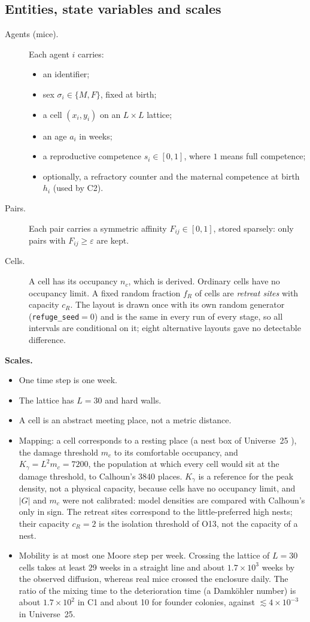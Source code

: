 \documentclass[preprint,12pt,authoryear]{elsarticle}
\begin{document}
\subsection*{Entities, state variables and scales}
\begin{description}
\item[Agents (mice).] Each agent $i$ carries:
  \begin{itemize}
  \item an identifier;
  \item sex $\sigma_i\in\{M,F\}$, fixed at birth;
  \item a cell $(x_i,y_i)$ on an $L\times L$ lattice;
  \item an age $a_i$ in weeks;
  \item a reproductive competence $s_i\in[0,1]$, where $1$ means full competence;
  \item optionally, a refractory counter and the maternal competence at birth $h_i$ (used by \textsf{C2}).
  \end{itemize}
\item[Pairs.] Each pair carries a symmetric affinity $F_{ij}\in[0,1]$, stored sparsely: only pairs with
  $F_{ij}\ge\varepsilon$ are kept.
\item[Cells.] A cell has its occupancy $n_c$, which is derived. Ordinary cells have no occupancy limit. A fixed
  random fraction $f_R$ of cells are \emph{retreat sites} with capacity $c_R$. The layout is drawn once with its own random
  generator (\texttt{refuge\_seed}${}=0$) and is the same in every run of every stage, so all intervals are
  conditional on it; eight alternative layouts gave no detectable
  difference.
\end{description}
\textbf{Scales.}
\begin{itemize}
\item One time step is one week.
\item The lattice has $L=30$ and hard walls.
\item A cell is an abstract meeting place, not a metric distance.
\item Mapping: a cell corresponds to a resting place (a nest box of Universe~25 \citep{Calhoun1973}), the damage
  threshold $m_c$ to its comfortable occupancy, and $K_\gamma=L^2 m_c=7200$, the population at which every cell would
  sit at the damage threshold, to Calhoun's 3840 places. $K_\gamma$ is a reference for the peak density, not a
  physical capacity, because cells have no occupancy limit, and $|G|$ and $m_c$ were not calibrated: model densities
  are compared with Calhoun's only in sign. The retreat sites correspond to the little-preferred high nests; their capacity
  $c_R=2$ is the isolation threshold of O13, not the capacity of a nest.
\item Mobility is at most one Moore step per week. Crossing the lattice of $L=30$ cells takes at least 29 weeks in a
  straight line and about $1.7\times10^3$ weeks by the observed diffusion, whereas real mice crossed the enclosure
  daily. The ratio of the mixing time to the deterioration time (a Damk\"ohler number) is about $1.7\times10^2$ in
  \textsf{C1} and about 10 for founder colonies, against $\lesssim4\times10^{-3}$ in Universe~25.
\end{itemize}
\end{document}
